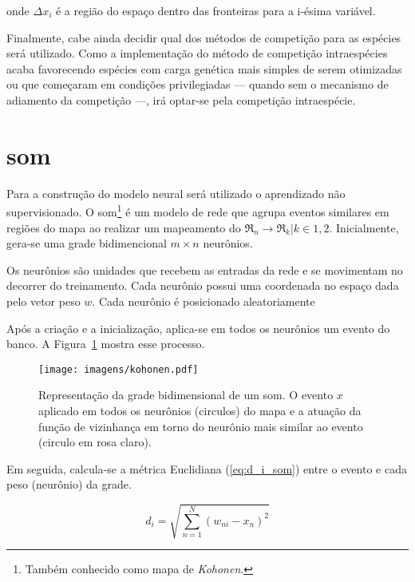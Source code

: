 \noindent onde $\Delta x_i$ é a região do espaço dentro das fronteiras
para a i-ésima variável.

Finalmente, cabe ainda decidir qual dos métodos de competição para as
espécies será utilizado. Como a implementação do método de competição
intraespécies acaba favorecendo espécies com carga genética mais
simples de serem otimizadas ou que começaram em condições 
privilegiadas --- quando sem o mecanismo de adiamento da competição
---, irá optar-se pela competição intraespécie.

\section[Mapas Auto-Organizáveis]{\acl{som}}
\label{ssec:som}

Para a construção do modelo neural será utilizado o aprendizado não
supervisionado. O \acf{som}\footnote{Também conhecido como mapa de
\emph{Kohonen}.} \cite[cap 9]{haykin1999neural} é um modelo de rede que
agrupa eventos similares em regiões do mapa ao realizar um mapeamento
do $\Re_{n} \rightarrow \Re_{k} | k \in {1,2}$. Inicialmente, gera-se
uma grade bidimencional $m \times n$ neurônios.

Os neurônios são unidades que recebem as entradas da rede e se
movimentam no decorrer do treinamento. Cada neurônio possui uma
coordenada no espaço dada pelo vetor peso $w$. Cada neurônio é
posicionado aleatoriamente 
	 
Após a criação e a inicialização, aplica-se em todos os neurônios um
evento do banco. A Figura~\ref{fig:som_representacao} mostra esse
processo. 

\begin{figure}[h!tb]
\centering
\texttt{[image: imagens/kohonen.pdf]}
\caption[Representação da grade bidimensional de um SOM]{
Representação da grade bidimensional de um \acl{som}. O evento $x$
aplicado em todos os neurônios (circulos) do mapa e a atuação da
função de vizinhança em torno do neurônio mais similar ao evento
(circulo em rosa claro).}
\label{fig:som_representacao}
\end{figure}

Em seguida, calcula-se a métrica Euclidiana (\ref{eq:d_i_som}) entre o
evento e cada peso (neurônio) da grade. 

\begin{equation}\label{eq:d_i_som}
d_{i} = \sqrt{\sum_{n=1}^{N}(w_{ni}-x_{n})^{2}}
\end{equation}

